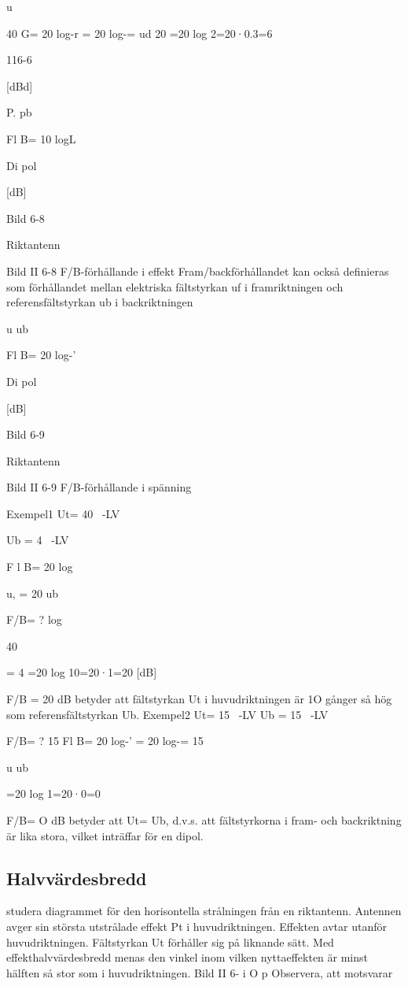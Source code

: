 u

40
G= 20 log-r = 20 log-=
ud
20
=20 log 2=20·0.3=6

116-6

[dBd]

P.
pb

Fl B= 10 logL

Di pol

[dB]

Bild 6-8

Riktantenn

Bild II 6-8 F/B-förhållande i effekt
Fram/backförhållandet kan också definieras som förhållandet mellan elektriska
fältstyrkan uf i framriktningen och referensfältstyrkan ub i backriktningen

u
ub

Fl B= 20 log-'

Di pol

[dB]

Bild 6-9

Riktantenn

Bild II 6-9 F/B-förhållande i spänning

Exempel1
Ut= 40 ~-LV

Ub = 4 ~-LV

F l B= 20 log

u, = 20
ub

F/B= ?
log

40

=
4
=20 log 10=20·1=20 [dB]

F/B = 20 dB betyder att fältstyrkan Ut i
huvudriktningen är 1O gånger så hög som
referensfältstyrkan Ub.
Exempel2
Ut= 15 ~-LV Ub = 15 ~-LV

F/B= ?
15
Fl B= 20 log-' = 20 log-=
15

u
ub

=20 log 1=20·0=0

F/B= O dB betyder att Ut= Ub, d.v.s. att
fältstyrkorna i fram- och backriktning är lika
stora, vilket inträffar för en dipol.

\subsection{Halvvärdesbredd}
studera diagrammet för den horisontella
strålningen från en riktantenn.
Antennen avger sin största utstrålade
effekt Pt i huvudriktningen. Effekten avtar
utanför huvudriktningen. Fältstyrkan Ut förhåller sig på liknande sätt.
Med effekthalvvärdesbredd menas den
vinkel inom vilken nyttaeffekten är minst
hälften så stor som i huvudriktningen.
Bild II 6- i O
p
Observera, att
motsvarar ~

